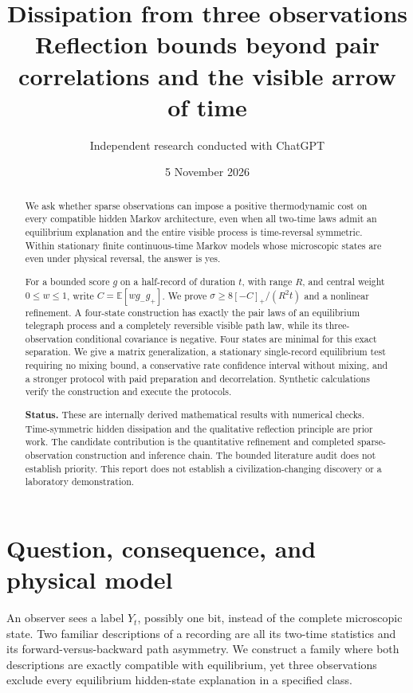 \documentclass[11pt,a4paper]{article}
\title{Dissipation from three observations\\\large Reflection bounds beyond pair correlations and the visible arrow of time}
\author{Independent research conducted with ChatGPT}
\date{5 November 2026}
\newcommand{\E}{\mathbb E}\newcommand{\Prb}{\mathbb P}
\begin{document}
\maketitle
\begin{abstract}
We ask whether sparse observations can impose a positive thermodynamic cost on every compatible hidden Markov architecture, even when all two-time laws admit an equilibrium explanation and the entire visible process is time-reversal symmetric. Within stationary finite continuous-time Markov models whose microscopic states are even under physical reversal, the answer is yes.

For a bounded score $g$ on a half-record of duration $t$, with range $R$, and central weight $0\leq w\leq1$, write $C=\E[w g_-g_+]$. We prove $\sigma\geq8[-C]_+/(R^2t)$ and a nonlinear refinement. A four-state construction has exactly the pair laws of an equilibrium telegraph process and a completely reversible visible path law, while its three-observation conditional covariance is negative. Four states are minimal for this exact separation. We give a matrix generalization, a stationary single-record equilibrium test requiring no mixing bound, a conservative rate confidence interval without mixing, and a stronger protocol with paid preparation and decorrelation. Synthetic calculations verify the construction and execute the protocols.

\textbf{Status.} These are internally derived mathematical results with numerical checks. Time-symmetric hidden dissipation and the qualitative reflection principle are prior work. The candidate contribution is the quantitative refinement and completed sparse-observation construction and inference chain. The bounded literature audit does not establish priority. This report does not establish a civilization-changing discovery or a laboratory demonstration.
\end{abstract}
\setcounter{tocdepth}{1}
\begingroup\small\setlength{\parskip}{0pt}
\tableofcontents
\endgroup
\newpage
\section{Question, consequence, and physical model}
An observer sees a label $Y_t$, possibly one bit, instead of the complete microscopic state. Two familiar descriptions of a recording are all its two-time statistics and its forward-versus-backward path asymmetry. We construct a family where both descriptions are exactly compatible with equilibrium, yet three observations exclude every equilibrium hidden-state explanation in a specified class.
\end{document}
